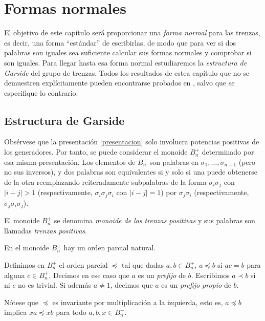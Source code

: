 \documentclass[TFG.tex]{subfiles}
\begin{document}
\chapter{Formas normales}

El objetivo de este capítulo será proporcionar una \emph{forma normal} para las trenzas, es decir, una forma ``estándar'' de escribirlas, de modo que para ver si dos palabras son iguales sea suficiente calcular sus formas normales y comprobar si son iguales. Para llegar hasta esa forma normal estudiaremos la \emph{estructura de Garside} del grupo de trenzas. Todos los resultados de estea capítulo que no se demuestren explícitamente pueden encontrarse probados en \cite{Garside}, salvo que se especifique lo contrario.

\section{Estructura de Garside}



Obsérvese que la presentación \ref{presentacion} solo involucra potencias positivas de los generadores. Por tanto, se puede considerar el monoide $B_n^+$ determinado por esa misma presentación. Los elementos de $B_n^+$ son palabras en $\sigma_1,\dots,\sigma_{n-1}$ (pero no sus inversos), y dos palabras son equivalentes si y solo si una puede obtenerse de la otra reemplazando reiteradamente subpalabras de la forma $\sigma_i\sigma_j$ con $|i-j|>1$ (respectivamente, $\sigma_i\sigma_j\sigma_i$ con $|i-j|=1$) por $\sigma_j\sigma_i$ (respectivamente, $\sigma_j\sigma_i\sigma_j$).

\begin{defi}
El monoide $B_n^+$ se denomina \emph{monoide de las trenzas positivas} y sus palabras son llamadas \emph{trenzas positivas}.
\end{defi}
En el monoide $B_n^+$ hay un orden parcial natural. 
\begin{defi}
Definimos en $B_n^+$ el orden parcial $\preccurlyeq$ tal que dadas $a,b\in B_n^+$, $a\preccurlyeq b$ si $ac=b$ para alguna $c\in B_n^+$. Decimos en ese caso que $a$ es un \emph{prefijo} de $b$. Escribimos $a\prec b$ si ni $c$ no es trivial. Si además $a\neq 1$, decimos que $a$ es un \emph{prefijo propio} de $b$. 
\end{defi}
Nótese que $\preccurlyeq$ es invariante por multiplicación a la izquierda, esto es, $a\preccurlyeq b$ implica $xa\preccurlyeq xb$ para todo $a,b,x\in B_n^+$. %
\end{document}
